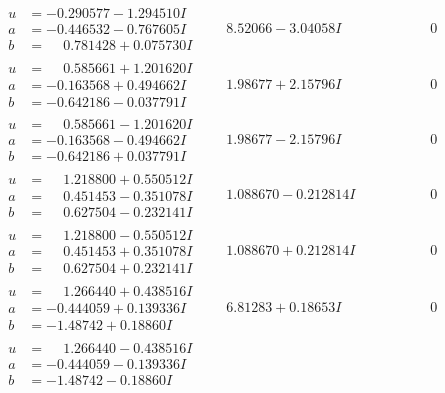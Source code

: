 \documentclass[1p]{elsarticle_modified}
\theoremstyle{definition}
\begin{document}
$$\begin{array}{c|c|c}
\begin{aligned}
u &= -0.290577 - 1.294510 I \\
a &= -0.446532 - 0.767605 I \\
b &= \phantom{-}0.781428 + 0.075730 I\end{aligned}
 & \phantom{-}8.52066 - 3.04058 I & \phantom{-0.000000 } 0 \\ \hline\begin{aligned}
u &= \phantom{-}0.585661 + 1.201620 I \\
a &= -0.163568 + 0.494662 I \\
b &= -0.642186 - 0.037791 I\end{aligned}
 & \phantom{-}1.98677 + 2.15796 I & \phantom{-0.000000 } 0 \\ \hline\begin{aligned}
u &= \phantom{-}0.585661 - 1.201620 I \\
a &= -0.163568 - 0.494662 I \\
b &= -0.642186 + 0.037791 I\end{aligned}
 & \phantom{-}1.98677 - 2.15796 I & \phantom{-0.000000 } 0 \\ \hline\begin{aligned}
u &= \phantom{-}1.218800 + 0.550512 I \\
a &= \phantom{-}0.451453 - 0.351078 I \\
b &= \phantom{-}0.627504 - 0.232141 I\end{aligned}
 & \phantom{-}1.088670 - 0.212814 I & \phantom{-0.000000 } 0 \\ \hline\begin{aligned}
u &= \phantom{-}1.218800 - 0.550512 I \\
a &= \phantom{-}0.451453 + 0.351078 I \\
b &= \phantom{-}0.627504 + 0.232141 I\end{aligned}
 & \phantom{-}1.088670 + 0.212814 I & \phantom{-0.000000 } 0 \\ \hline\begin{aligned}
u &= \phantom{-}1.266440 + 0.438516 I \\
a &= -0.444059 + 0.139336 I \\
b &= -1.48742 + 0.18860 I\end{aligned}
 & \phantom{-}6.81283 + 0.18653 I & \phantom{-0.000000 } 0 \\ \hline\begin{aligned}
u &= \phantom{-}1.266440 - 0.438516 I \\
a &= -0.444059 - 0.139336 I \\
b &= -1.48742 - 0.18860 I\end{aligned}

\end{array}$$
\end{document}
